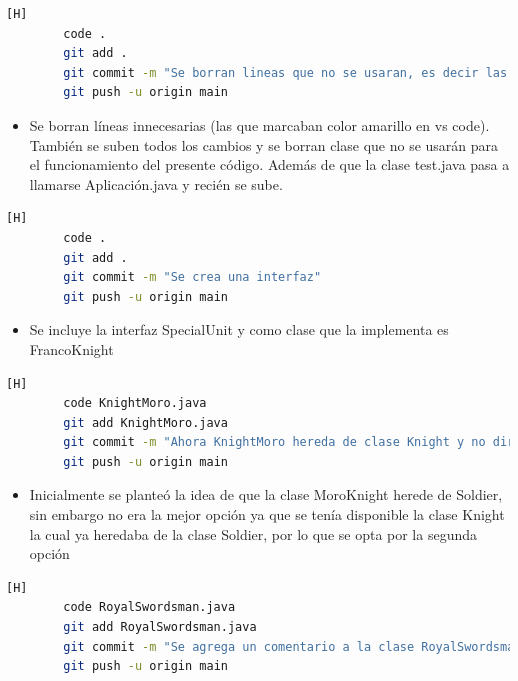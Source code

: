 \documentclass{article}
\begin{document}
	
	
	
	\begin{lstlisting}[language=bash,caption={Commit: 9b67006f46efdfb1cc92fbb419f399d028db2213 }][H]
		code .
		git add .
		git commit -m "Se borran lineas que no se usaran, es decir las de color amarillo, ademas se corrigen ciertos detalles"			
		git push -u origin main
	\end{lstlisting}
	
	
	\begin{itemize}
		\item Se borran líneas innecesarias (las que marcaban color amarillo en vs code). También se suben todos los cambios y se borran clase que no se usarán para el funcionamiento del presente código.  Además de que la clase test.java pasa a llamarse Aplicación.java y recién se sube.
	\end{itemize}
	
	
	
	\begin{lstlisting}[language=bash,caption={Commit: af25af9eba9738c387d5278b1dad3f96ea09b9dd }][H]
		code .
		git add .
		git commit -m "Se crea una interfaz"			
		git push -u origin main
	\end{lstlisting}
	
	
	\begin{itemize}
		\item Se incluye la interfaz SpecialUnit y como clase que la implementa es  FrancoKnight
	\end{itemize}
	
	
	
	
	
	
	\begin{lstlisting}[language=bash,caption={Commit: 7b08c6a9f49ffb37c5cbc874838d632493097c57 }][H]
		code KnightMoro.java
		git add KnightMoro.java
		git commit -m "Ahora KnightMoro hereda de clase Knight y no directamente de Soldier"			
		git push -u origin main
	\end{lstlisting}
	
	
	\begin{itemize}
		\item Inicialmente se planteó la idea de que la clase MoroKnight herede de Soldier, sin embargo no era la mejor opción ya que se tenía disponible la clase Knight la cual ya heredaba de la clase Soldier, por lo que se opta por la segunda opción
	\end{itemize}
	
	
	\begin{lstlisting}[language=bash,caption={Commit: 9690a266c6e653a2360b420441c38eb2c0023e14 }][H]
		code RoyalSwordsman.java
		git add RoyalSwordsman.java
		git commit -m "Se agrega un comentario a la clase RoyalSwordsman"			
		git push -u origin main
	\end{lstlisting}
	
\end{document}
